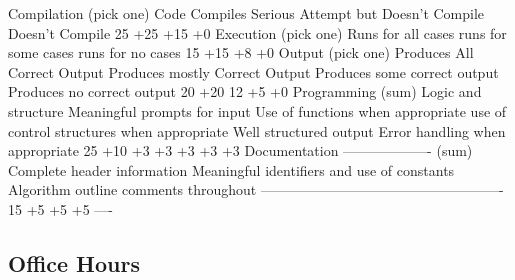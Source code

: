 \documentclass{beamer}
\begin{document}
Compilation (pick one)
Code Compiles
Serious Attempt but Doesn't Compile
Doesn't Compile
25%
+25
+15
+0
Execution (pick one)
Runs for all cases 
runs for some cases 
runs for no cases
15%
+15
+8
+0
Output (pick one)
Produces All Correct Output 
Produces mostly Correct Output 
Produces some correct output 
Produces no correct output
20%
+20
12
+5
+0
Programming (sum)
Logic and structure
Meaningful prompts for input
Use of functions when appropriate
use of control structures when appropriate
Well structured output
Error handling when appropriate
25%
+10
+3
+3
+3
+3
+3
Documentation
-------------------
(sum)
Complete header information
Meaningful identifiers and use of constants
Algorithm outline comments throughout
----------------------------------------------------
15%
+5
+5
+5
----

\begin{frame}
\section{Office Hours}
\end{frame}
\end{document}
